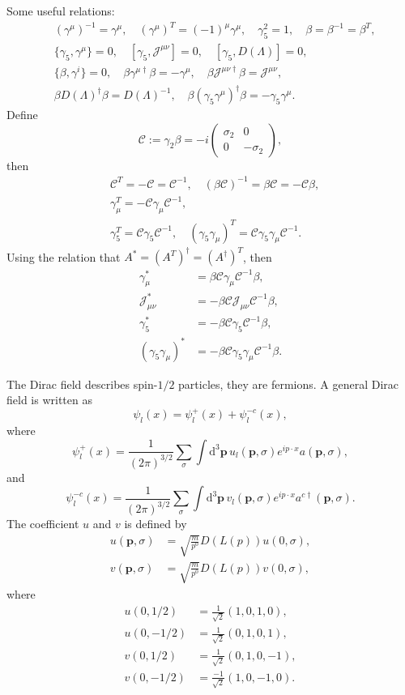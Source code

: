 \documentclass[10pt]{article}
\begin{document}
Some useful relations:
\[
\begin{split}
	&(\gamma^{\mu})^{-1}=\gamma^{\mu},\quad (\gamma^\mu)^T=(-1)^\mu \gamma^\mu, \quad \gamma_5^2=1,\quad \beta=\beta^{-1}=\beta^T,\\
	&\{\gamma_5,\gamma^\mu\}=0,\quad [\gamma_5,\mathscr{J}^{\mu\nu}]=0,\quad [\gamma_5,D(\Lambda)]=0,\\
	&\{\beta,\gamma^i\}=0,\quad\beta \gamma^{\mu\dag}\beta=-\gamma^{\mu},\quad \beta \mathscr{J}^{\mu\nu\dag}\beta=\mathscr{J}^{\mu\nu},\\
	&\beta D(\Lambda)^\dag \beta=D(\Lambda)^{-1}, \quad \beta (\gamma_5\gamma^{\mu})^\dag\beta=-\gamma_5\gamma^{\mu}.
\end{split}
\]
Define 
\[
	\mathscr{C}:=\gamma_2\beta=-i \begin{pmatrix}
		\sigma_2&0\\
		0&-\sigma_2
	\end{pmatrix},
\]
then 
\[
\begin{split}
	&\mathscr{C}^T=-\mathscr{C}=\mathscr{C}^{-1},\quad (\beta\mathscr{C})^{-1}=\beta\mathscr{C}=-\mathscr{C}\beta,\\
	&\gamma_\mu^T=-\mathscr{C}\gamma_\mu \mathscr{C}^{-1},\\
	&\gamma_5^T=\mathscr{C}\gamma_5 \mathscr{C}^{-1},\quad (\gamma_5\gamma_\mu)^T=\mathscr{C}\gamma_5\gamma_\mu \mathscr{C}^{-1}.
\end{split}
\]
Using the relation that $A^*=(A^T)^\dag=(A^\dag)^T$, then 
\[
\begin{split}
	\gamma_\mu^*&=\beta\mathscr{C}\gamma_\mu \mathscr{C}^{-1} \beta,\\
	\mathscr{J}_{\mu\nu}^*&=-\beta\mathscr{C}\mathscr{J}_{\mu\nu} \mathscr{C}^{-1} \beta,\\
	\gamma_5^*&=-\beta\mathscr{C}\gamma_5 \mathscr{C}^{-1}\beta,\\
	(\gamma_5\gamma_\mu)^*&=-\beta\mathscr{C}\gamma_5\gamma_\mu \mathscr{C}^{-1}\beta.
\end{split}
\]

The Dirac field describes spin-$1/2$ particles, they are fermions. A general Dirac field is written as
\[
	\psi_l(x)=\psi^+_l(x)+\psi^{-c}_l(x),
\]
where
\[
	\psi^+_l(x)=\frac{1}{(2\pi)^{3/2}}\sum_\sigma\int \mathrm{d}^3\bm{p}\,u_l(\bm{p},\sigma)e^{ip\cdot x}a(\bm{p},\sigma),
\]
and
\[
	\psi^{-c}_l(x)=\frac{1}{(2\pi)^{3/2}}\sum_\sigma\int \mathrm{d}^3\bm{p}\,v_l(\bm{p},\sigma)e^{ip\cdot x}a^{c\dag}(\bm{p},\sigma).
\]
The coefficient $u$ and $v$ is defined by
\begin{align*}
	u(\bm{p},\sigma)&=\sqrt{\frac{m}{p^0}}D(L(p))u(0,\sigma),\\
	v(\bm{p},\sigma)&=\sqrt{\frac{m}{p^0}}D(L(p))v(0,\sigma),
\end{align*}
where
\begin{align*}
	u(0,1/2)&=\frac{1}{\sqrt{2}}(1,0,1,0),\\
	u(0,-1/2)&=\frac{1}{\sqrt{2}}(0,1,0,1),\\
	v(0,1/2)&=\frac{1}{\sqrt{2}}(0,1,0,-1),\\
	v(0,-1/2)&=\frac{-1}{\sqrt{2}}(1,0,-1,0).
\end{align*}
\end{document}
